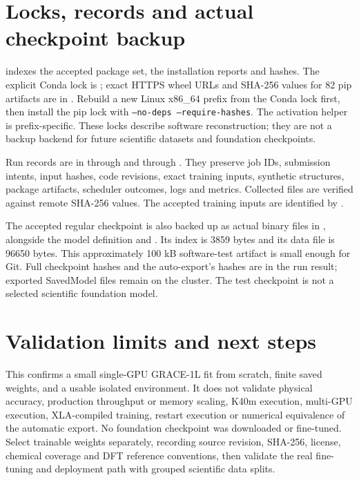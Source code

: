 \documentclass[10pt,a4paper]{article}
\begin{document}
\section{Locks, records and actual checkpoint backup}
 indexes the accepted package set,
the installation reports and hashes. The explicit Conda lock is
; exact HTTPS wheel
URLs and SHA-256 values for 82 pip artifacts are in
.
Rebuild a new Linux x86\_64 prefix from the Conda lock first, then install the
pip lock with \texttt{--no-deps --require-hashes}. The activation helper is
prefix-specific. These locks describe software reconstruction; they are not
a backup backend for future scientific datasets and foundation checkpoints.

Run records are in  through
 and
 through
. They preserve job IDs, submission intents,
input hashes, code revisions, exact training inputs, synthetic structures,
package artifacts, scheduler outcomes, logs and metrics. Collected files are
verified against remote SHA-256 values. The accepted training inputs are
identified by .

The accepted regular checkpoint is also backed up as actual binary files in
, alongside the model definition
and . Its index is 3859 bytes and its data file
is 96650 bytes. This approximately 100 kB software-test artifact is small
enough for Git. Full checkpoint hashes and the auto-export's hashes are in
the run result; exported SavedModel files remain on the cluster.
The test checkpoint is not a selected scientific foundation model.

\section{Validation limits and next steps}
This confirms a small single-GPU GRACE-1L fit from scratch, finite saved weights,
and a usable isolated environment. It does not validate physical accuracy,
production throughput or memory scaling, K40m execution, multi-GPU execution,
XLA-compiled training, restart execution or numerical equivalence of the
automatic export. No foundation checkpoint was downloaded or fine-tuned.
Select trainable weights separately, recording source revision, SHA-256,
license, chemical coverage and DFT reference conventions, then validate the
real fine-tuning and deployment path with grouped scientific data splits.
\end{document}
